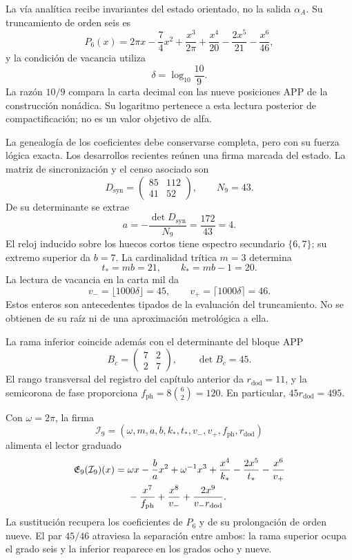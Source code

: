 La vía analítica recibe invariantes del estado orientado, no la salida
\(\alpha_A\). Su truncamiento de orden seis es
\begin{equation}
 P_6(x)=2\pi x-\frac74x^2
 +\frac{x^3}{2\pi}
 +\frac{x^4}{20}-\frac{2x^5}{21}-\frac{x^6}{46},
 \label{x_reciprocidad:eq:alpha-p6}
\end{equation}
y la condición de vacancia utiliza
\[
 \delta=\log_{10}\frac{10}{9}.
\]
La razón \(10/9\) compara la carta decimal con las nueve posiciones
APP de la construcción nonádica. Su logaritmo pertenece a esta lectura
posterior de compactificación; no es un valor objetivo de alfa.

La genealogía de los coeficientes debe conservarse completa, pero con su
fuerza lógica exacta. Los desarrollos recientes reúnen una firma marcada
del estado. La matriz de sincronización y el censo asociado son
\[
 D_{\mathrm{syn}}=\begin{pmatrix}85&112\\41&52\end{pmatrix},
 \qquad N_9=43.
\]
De su determinante se extrae
\[
 a=-\frac{\det D_{\mathrm{syn}}}{N_9}
   =\frac{172}{43}=4.
\]
El reloj inducido sobre los huecos cortos tiene espectro secundario
\(\{6,7\}\); su extremo superior da \(b=7\). La cardinalidad
trítica \(m=3\) determina
\[
 t_*=mb=21,\qquad k_*=mb-1=20.
\]
La lectura de vacancia en la carta mil da
\[
 v_-=\lfloor1000\delta\rfloor=45,\qquad
 v_+=\lceil1000\delta\rceil=46.
\]
Estos enteros son antecedentes tipados de la evaluación del truncamiento. No se
obtienen de su raíz ni de una aproximación metrológica a ella.

La rama inferior coincide además con el determinante del bloque APP
\[
 B_c=\begin{pmatrix}7&2\\2&7\end{pmatrix},\qquad\det B_c=45.
\]
El rango transversal del registro del capítulo anterior da
\(r_{\mathrm{dod}}=11\), y la semicorona de fase proporciona
\(f_{\mathrm{ph}}=8\binom62=120\). En particular,
\(45r_{\mathrm{dod}}=495\).

Con \(\omega=2\pi\), la firma
\[
 \mathcal I_9=(\omega,m,a,b,k_*,t_*,v_-,v_+,f_{\mathrm{ph}},r_{\mathrm{dod}})
\]
alimenta el lector graduado
\begin{align}
 \mathfrak E_9(\mathcal I_9)(x)
 ={}&\omega x-\frac ba x^2+\omega^{-1}x^3
 +\frac{x^4}{k_*}-\frac{2x^5}{t_*}-\frac{x^6}{v_+}\notag\\
 &-\frac{x^7}{f_{\mathrm{ph}}}+\frac{x^8}{v_-}
 +\frac{2x^9}{v_-r_{\mathrm{dod}}}.
 \label{x_reciprocidad:eq:alpha-firma-coeficientes}
\end{align}
La sustitución recupera los coeficientes de \(P_6\) y de su
prolongación de orden nueve. El par \(45/46\) atraviesa la separación
entre ambos: la rama superior ocupa el grado seis y la inferior reaparece
en los grados ocho y nueve.

